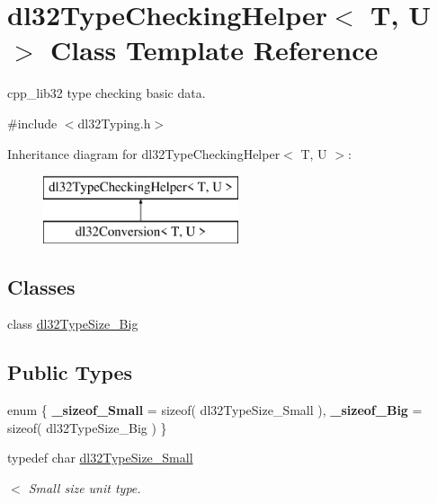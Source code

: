 \hypertarget{classdl32_type_checking_helper}{\section{dl32\-Type\-Checking\-Helper$<$ T, U $>$ Class Template Reference}
\label{classdl32_type_checking_helper}
}


cpp\-\_\-lib32 type checking basic data.  




{\ttfamily \#include $<$dl32\-Typing.\-h$>$}

Inheritance diagram for dl32\-Type\-Checking\-Helper$<$ T, U $>$\-:\begin{figure}[H]
\begin{center}
\leavevmode
\includegraphics[height=2.000000cm]{classdl32_type_checking_helper}
\end{center}
\end{figure}
\subsection*{Classes}
\begin{DoxyCompactItemize}
\item 
class \hyperlink{classdl32_type_checking_helper_1_1dl32_type_size___big}{dl32\-Type\-Size\-\_\-\-Big}
\end{DoxyCompactItemize}
\subsection*{Public Types}
\begin{DoxyCompactItemize}
\item 
enum \{ {\bfseries \-\_\-sizeof\-\_\-\-Small} = sizeof( dl32\-Type\-Size\-\_\-\-Small ), 
{\bfseries \-\_\-sizeof\-\_\-\-Big} = sizeof( dl32\-Type\-Size\-\_\-\-Big )
 \}
\item 
typedef char \hyperlink{classdl32_type_checking_helper_aaf5aef650f2cd1d9267758bb505134ba}{dl32\-Type\-Size\-\_\-\-Small}
\begin{DoxyCompactList}\small\item\em $<$ Small size unit type. \end{DoxyCompactList}\end{DoxyCompactItemize}
